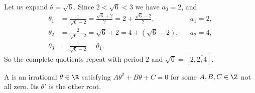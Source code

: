 \begin{example}
	Let us expand $\theta = \sqrt6$. Since $2 < \sqrt6 < 3$ we have $a_0 = 2$, and
	\begin{align*}
		\theta_1 &= \frac1{\sqrt6 - 2} = \frac{\sqrt6+2}{2} = 2 + \frac{\sqrt6 - 2}2, &&a_1 = 2, \\
		\theta_2 &= \frac2{\sqrt6-2} = \sqrt6 + 2 = 4 + (\sqrt 6 - 2), &&a_2 = 4, \\
		\theta_3 &= \frac1{\sqrt6-2} = \theta_1.
	\end{align*}
	So the complete quotients repeat with period $2$ and $\sqrt6 = [2, \overline{2, 4}]$.
\end{example}

\begin{definition}
	A  is an irrational $\theta \in \R$ satisfying $A\theta^2 + B\theta + C = 0$ for some $A, B, C \in \Z$ not all zero. Its  $\theta'$ is the other root.
\end{definition}

